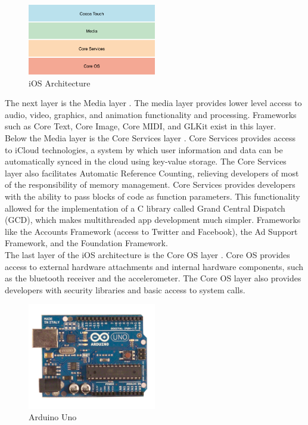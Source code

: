 \documentclass[10pt]{article}
\begin{document}
\begin{multicols}{2}
\begin{figure}[H]
\centering
\includegraphics[width=0.5\textwidth]{ios_arch.png}
\caption{iOS Architecture \cite{iosoverview}}
\end{figure}
 
The next layer is the Media layer \cite{iosmedia}. The media layer provides lower level access to audio, video, graphics, and animation functionality and processing. Frameworks such as Core Text, Core Image, Core MIDI, and GLKit exist in this layer. \\

Below the Media layer is the Core Services layer \cite{ioscoreservices}. Core Services provides access to iCloud technologies, a system by which user information and data can be automatically synced in the cloud using key-value storage. The Core Services layer also facilitates Automatic Reference Counting, relieving developers of most of the responsibility of memory management. Core Services provides developers with the ability to pass blocks of code as function parameters. This functionality allowed for the implementation of a C library called Grand Central Dispatch (GCD), which makes multithreaded app development much simpler. Frameworks like the Accounts Framework (access to Twitter and Facebook), the Ad Support Framework, and the Foundation Framework. \\

The last layer of the iOS architecture is the Core OS layer \cite{ioscoreos}. Core OS provides access to external hardware attachments and internal hardware components, such as the bluetooth receiver and the accelerometer. The Core OS layer also provides developers with security libraries and basic access to system calls. \\

\begin{figure}[H]
\centering
\includegraphics[width=0.5\textwidth]{arduino.jpg}
\caption{Arduino Uno}
\end{figure}


\end{multicols}
\end{document}
